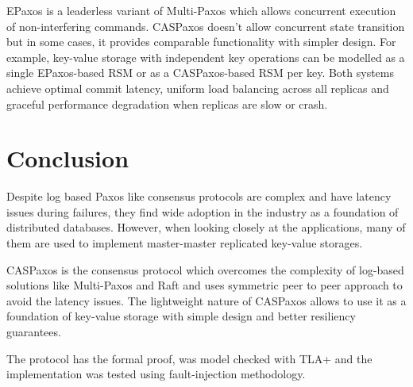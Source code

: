 \documentclass[12pt]{article}
\theoremstyle{definition}
\begin{document}
EPaxos is a leaderless variant of Multi-Paxos which allows concurrent execution of non-interfering commands. CASPaxos doesn't allow concurrent state transition but in some cases, it provides comparable functionality with simpler design. For example, key-value storage with independent key operations can be modelled as a single EPaxos-based RSM or as a CASPaxos-based RSM per key. Both systems achieve optimal commit latency, uniform load balancing across all replicas and graceful performance degradation when replicas are slow or crash.

\section{Conclusion}

Despite log based Paxos like consensus protocols are complex and have latency issues during failures, they find wide adoption in the industry as a foundation of distributed databases. However, when looking closely at the applications, many of them are used to implement master-master replicated key-value storages.

CASPaxos is the consensus protocol which overcomes the complexity of log-based solutions like Multi-Paxos and Raft and uses symmetric peer to peer approach to avoid the latency issues. The lightweight nature of CASPaxos allows to use it as a foundation of key-value storage with simple design and better resiliency guarantees.

The protocol has the formal proof, was model checked with TLA+ and the implementation was tested using fault-injection methodology.
\end{document}
